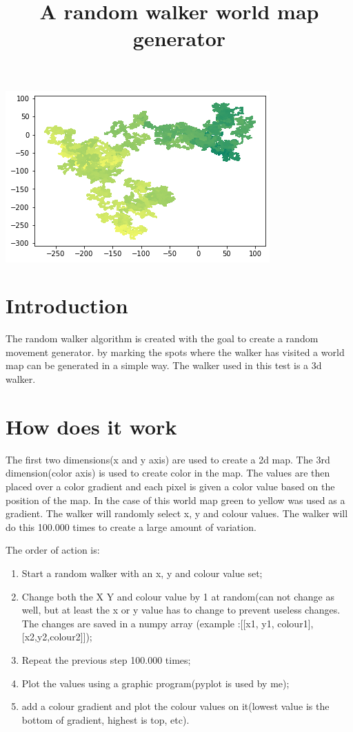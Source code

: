 \documentclass[8pt,letterpaper]{article}
\begin{document}
\title{A random walker world map generator}
\maketitle

\includegraphics{Images/random_walker_world.png}
\newpage{}
\section{Introduction}
The random walker algorithm is created with the goal to create a random movement generator. by marking the spots where the walker has visited a world map can be generated in a simple way. The walker used in this test is a 3d walker. 

\section{How does it work}
The first two dimensions(x and y axis) are used to create a 2d map. The 3rd dimension(color axis) is used to create color in the map. The values are then placed over a color gradient and each pixel is given a color value based on the position of the map. In the case of this world map green to yellow was used as a gradient. The walker will randomly select x, y and colour values. The walker will do this 100.000 times to create a large amount of variation.

The order of action is:

\begin{enumerate}
	\item Start a random walker with an x, y and colour value set;
	\item Change both the X Y and colour value by 1 at random(can not change as well, but at least the x or y value has to change to prevent useless changes. The changes are saved in a numpy array (example :[[x1, y1, colour1],[x2,y2,colour2]]);
	\item Repeat the previous step 100.000 times;
	\item Plot the values using a graphic program(pyplot is used by me);
	\item add a colour gradient and plot the colour values on it(lowest value is the bottom of gradient, highest is top, etc).
\end{enumerate}
\end{document}
